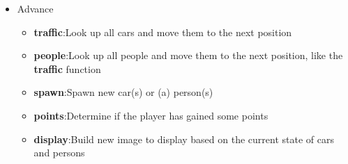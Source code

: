 \documentclass[12pt]{article}
\begin{document}
\begin{itemize}
\begin{itemize}
			\end{itemize}
		\item Advance
			\begin{itemize}				
				\item \textbf{traffic}:\quad Look up all cars and move them to the next position
				\item \textbf{people}:\quad Look up all people and move them to the next position, like the \textbf{traffic} function
				\item \textbf{spawn}:\quad Spawn new car(s) or (a) person(s)
				\item \textbf{points}:\quad Determine if the player has gained some points
				\item \textbf{display}:\quad Build new image to display based on the current state of cars and persons
			\end{itemize}
	\end{itemize}
\end{document}
